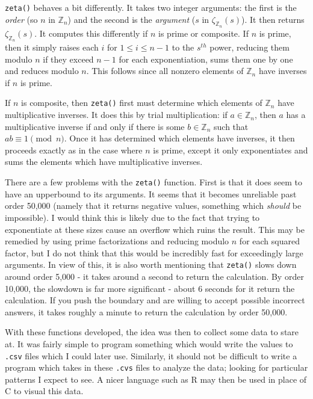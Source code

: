 \documentclass{amsart}
\begin{document}
{\tt zeta()} behaves a bit differently. It takes two integer arguments: the first is the \textit{order} (so $n$ in $\mathbb{Z}_n$) and the second is the \textit{argument} ($s$ in $\zeta_{\mathbb{Z}_n}(s)$). It then returns $\zeta_{\mathbb{Z}_n}(s)$. It computes this differently if $n$ is prime or composite. If $n$ is prime, then it simply raises each $i$ for $1\le i\le n-1$ to the $s^{th}$ power, reducing them modulo $n$ if they exceed $n-1$ for each exponentiation, sums them one by one and reduces modulo $n$. This follows since all nonzero elements of $\mathbb{Z}_n$ have inverses if $n$ is prime.

If $n$ is composite, then {\tt zeta()} first must determine which elements of $\mathbb{Z}_n$ have multiplicative inverses. It does this by trial multiplication: if $a\in\mathbb{Z}_n$, then $a$ has a multiplicative inverse if and only if there is some $b\in\mathbb{Z}_n$ such that $ab\equiv1\pmod{n}$. Once it has determined which elements have inverses, it then proceeds exactly as in the case where $n$ is prime, except it only exponentiates and sums the elements which have multiplicative inverses.

There are a few problems with the {\tt zeta()} function. First is that it does seem to have an upperbound to its arguments. It seems that it becomes unreliable past order 50,000 (namely that it returns negative values, something which \textit{should} be impossible). I would think this is likely due to the fact that trying to exponentiate at these sizes cause an overflow which ruins the result. This may be remedied by using prime factorizations and reducing modulo $n$ for each squared factor, but I  do not think that this would be incredibly fast for exceedingly large arguments. In view of this, it is also worth mentioning that {\tt zeta()} slows down around order 5,000 - it takes around a second to return the calculation. By order 10,000, the slowdown is far more significant - about 6 seconds for it return the calculation. If you push the boundary and are willing to accept possible incorrect answers, it takes roughly a minute to return the calculation by order 50,000.

With these functions developed, the idea was then to collect some data to stare at. It was fairly simple to program something which would write the values to {\tt .csv} files which I could later use. Similarly, it should not be difficult to write a program which takes in these {\tt .cvs} files to analyze the data; looking for particular patterns I expect to see. A nicer language such as R may then be used in place of C to visual this data.
\end{document}
